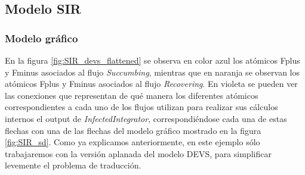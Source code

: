 \subsection{Modelo SIR}
\subsubsection{Modelo gráfico}
En la figura \ref{fig:SIR_devs_flattened} se observa en color azul los atómicos Fplus y Fminus asociados al flujo \textit{Succumbing}, mientras que en naranja se observan los atómicos Fplus y Fminus asociados al flujo \textit{Recovering}. En violeta se pueden ver las conexiones que representan de qué manera los diferentes atómicos correspondientes a cada uno de los flujos utilizan para realizar sus cálculos internos el output de \textit{InfectedIntegrator}, correspondiéndose cada una de estas flechas con una de las flechas del modelo gráfico mostrado en la figura \ref{fig:SIR_sd}. Como ya explicamos anteriormente, en este ejemplo sólo trabajaremos con la versión aplanada del modelo DEVS, para simplificar levemente el problema de traducción. 

